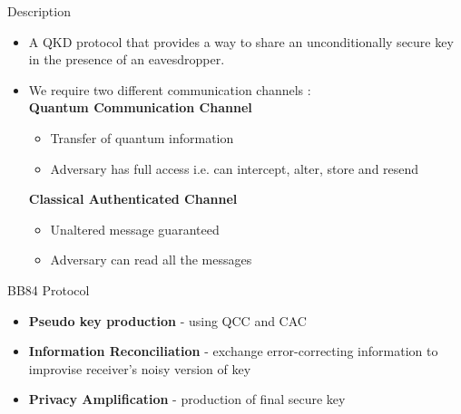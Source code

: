 \documentclass{beamer}
\begin{document}
\begin{frame}{Description}
    \begin{itemize}
        \item A QKD protocol that provides a way to share an unconditionally secure key in the presence of an eavesdropper.\\
        \item We require two different communication channels : \\
            \textbf{Quantum Communication Channel} \\
            \begin{itemize}
                \item Transfer of quantum information
                \item Adversary has full access i.e. can intercept, alter, store and resend
            \end{itemize}
            \textbf{Classical Authenticated Channel} \\
            \begin{itemize}
                \item Unaltered message guaranteed
                \item Adversary can read all the messages
            \end{itemize}
    \end{itemize}
\end{frame}

\begin{frame}{BB84 Protocol}
    \begin{itemize}[<+->]
        \item \textbf{Pseudo key production} -  using QCC and CAC
        \item \textbf{Information Reconciliation} - exchange error-correcting information to improvise receiver's noisy version of key
        \item \textbf{Privacy Amplification} -  production of final secure key 
    \end{itemize}
\end{frame}
\end{document}
